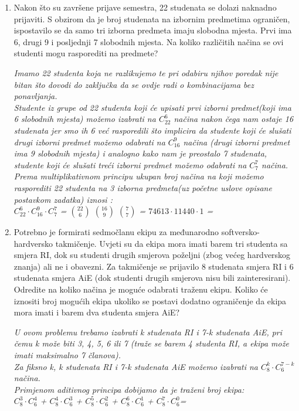 \documentclass[12pt]{article}
\begin{document}
    
	\begin{enumerate}
		\item Nakon što su završene prijave semestra, 22 studenata se dolazi naknadno prijaviti. S obzirom da je broj studenata na izbornim predmetima ograničen, ispostavilo se da samo tri izborna predmeta imaju slobodna mjesta. Prvi ima 6, drugi 9 i posljednji 7 slobodnih mjesta. Na koliko različitih načina se ovi studenti mogu rasporediti na predmete?
        \begin{center}
        \textit{Imamo 22 studenta koja ne razlikujemo te pri odabiru njihov poredak nije bitan što dovodi do zaključka da se ovdje radi o kombinacijama bez ponavljanja.\\
        Studente iz grupe od 22 studenta koji će upisati prvi izborni predmet(koji ima 6 slobodnih mjesta) možemo izabrati na $C^6_{22}$ načina nakon čega nam ostaje 16 studenata jer smo ih 6 već rasporedili što implicira da studente koji će slušati drugi izborni predmet možemo odabrati na $C^9_{16}$ načina (drugi izborni predmet ima 9 slobodnih mjesta) i analogno kako nam je preostalo 7 studenata, studente koji će slušati treći izborni predmet možemo odabrati na $C^7_{7}$ načina. Prema multiplikativnom principu ukupan broj načina na koji možemo rasporediti 22 studenta na 3 izborna predmeta(uz početne uslove opisane postavkom zadatka) iznosi :\\
        $C^6_{22} \cdot C^9_{16} \cdot C^7_{7}$ = $22 \choose 6$ $16 \choose 9$ $7 \choose 7$ = $74613 \cdot 11440 \cdot 1$ = 
        }
	    \end{center}
		\item Potrebno je formirati sedmočlanu ekipu za međunarodno softversko-hardversko takmičenje. Uvjeti su da ekipa mora imati barem tri studenta sa smjera RI, dok su studenti drugih smjerova poželjni (zbog većeg hardverskog znanja) ali ne i obavezni. Za takmičenje se prijavilo 8 studenata smjera RI i 6 studenata smjera AiE (dok studenti drugih smjerova nisu bili zainteresirani). Odredite na koliko načina je moguće odabrati traženu ekipu. Koliko će iznositi broj mogućih ekipa ukoliko se postavi dodatno ograničenje da ekipa mora imati i barem dva studenta smjera AiE?
		\begin{center}
		\textit{U ovom problemu trebamo izabrati k studenata RI i 7-k studenata AiE, pri čemu k može biti 3, 4, 5, 6 ili 7 (traže se barem 4 studenta RI, a ekipa može imati maksimalno 7 članova).\\Za fiksno k, k studenata RI i 7-k studenata AiE možemo izabrati na $C^k_8 \cdot C^{7-k}_6$ načina.\\Primjenom aditivnog principa dobijamo da je traženi broj ekipa:\\$C^3_8 \cdot C^{4}_6$ + $C^4_8 \cdot C^{3}_6$ + $C^5_8 \cdot C^{2}_6$ + $C^6_8 \cdot C^{1}_6$ + $C^7_8 \cdot C^{0}_6$=
}
\end{center}
\end{enumerate}
\end{document}
